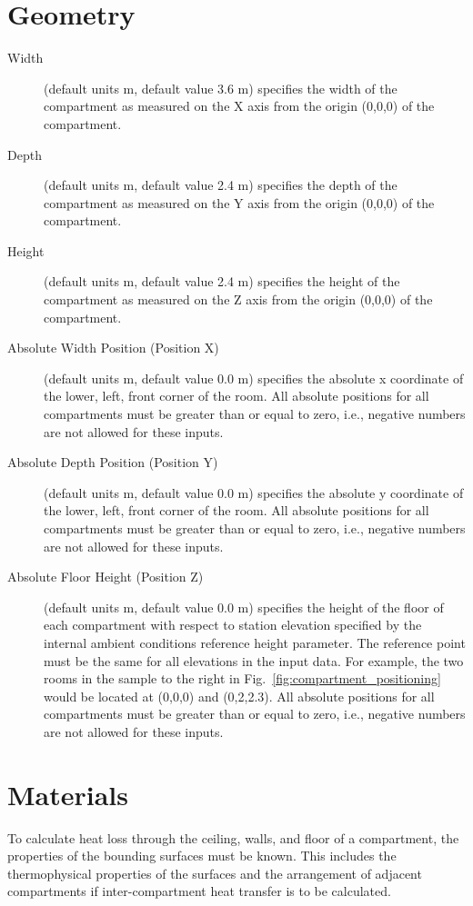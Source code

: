 \section{Geometry}
\label{info:COMP}
\begin{description}
\item[Width] (default units m, default value 3.6 m) specifies the width of the compartment as measured on the X axis from the origin (0,0,0) of the compartment.

\item[Depth]  (default units m, default value 2.4 m) specifies the depth of the compartment as measured on the Y axis from the origin (0,0,0) of the compartment.

\item[Height] (default units m, default value 2.4 m)  specifies the height of the compartment as measured on the Z axis from the origin (0,0,0) of the compartment.

\item[Absolute Width Position (Position X)] (default units m, default value 0.0 m)  specifies the absolute x coordinate of the lower, left, front corner of the room. All absolute positions for all compartments must be greater than or equal to zero, i.e., negative numbers are not allowed for these inputs.

\item[Absolute Depth Position (Position Y)] (default units m, default value 0.0 m)  specifies the absolute y coordinate of the lower, left, front corner of the room. All absolute positions for all compartments must be greater than or equal to zero, i.e., negative numbers are not allowed for these inputs.

\item[Absolute Floor Height (Position Z)] (default units m, default value 0.0 m)  specifies the height of the floor of each compartment with respect to station elevation specified by the internal ambient conditions reference height parameter.  The reference point must be the same for all elevations in the input data.  For example, the two rooms in the sample to the right in Fig.~\ref{fig:compartment_positioning} would be located at (0,0,0) and (0,2,2.3). All absolute positions for all compartments must be greater than or equal to zero, i.e., negative numbers are not allowed for these inputs.
\end{description}




\section{Materials}
\label{info:COMP2}
To calculate heat loss through the ceiling, walls, and floor of a compartment, the properties of the bounding surfaces must be known. This includes the thermophysical properties of the surfaces and the arrangement of adjacent compartments if inter-compartment heat transfer is to be calculated.

